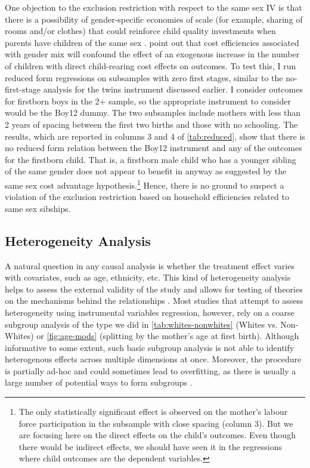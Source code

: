One objection to the exclusion restriction with respect to the same sex IV is that there is a possibility of gender-specific economies of scale (for example, sharing of rooms and/or clothes) that could reinforce child quality investments when parents have children of the same sex \parencite{clarke_children_2018}. \textcite{rosenzweig_natural_2000} point out that cost efficiencies associated with gender mix will confound the effect of an exogenous increase in the number of children with direct child-rearing cost effects on outcomes. To test this, I run reduced form regressions on subsamples with zero first stages, similar to the no-first-stage analysis for the twins instrument discussed earlier. I consider outcomes for firstborn boys in the 2+ sample, so the appropriate instrument to consider would be the Boy12 dummy. The two subsamples include mothers with less than 2 years of spacing between the first two births and those with no schooling. The results, which are reported in columns 3 and 4 of \autoref{tab:reduced}, show that there is no reduced form relation between the Boy12 instrument and any of the outcomes for the firstborn child. That is, a firstborn male child who has a younger sibling of the same gender does not appear to benefit in anyway as suggested by the same sex cost advantage hypothesis.\footnote{ The only statistically significant effect is observed on the mother's labour force participation in the subsample with close spacing (column 3). But we are focusing here on the direct effects on the child’s outcomes. Even though there would be indirect effects, we should have seen it in the regressions where child outcomes are the dependent variables. } Hence, there is no ground to suspect a violation of the exclusion restriction based on household efficiencies related to same sex sibships. 


\subsection{Heterogeneity Analysis}

A natural question in any causal analysis is whether the treatment effect varies with covariates, such as age, ethnicity, etc. This kind of heterogeneity analysis helps to assess the external validity of the study and allows for testing of theories on the mechanisms behind the relationships \parencite[e.g.,][]{angrist_children_1998}. Most studies that attempt to assess heterogeneity using instrumental variables regression, however, rely on a coarse subgroup analysis of the type we did in \autoref{tab:whites-nonwhites} (Whites vs. Non-Whites) or \autoref{fig:age-mods} (splitting by the mother's age at first birth). Although informative to some extent, such basic subgroup analysis is not able to identify heterogenous effects across multiple dimensions at once. Moreover, the procedure is partially ad-hoc and could sometimes lead to overfitting, as there is usually a large number of potential ways to form subgroups \parencite{Chernozhukov2018}.

